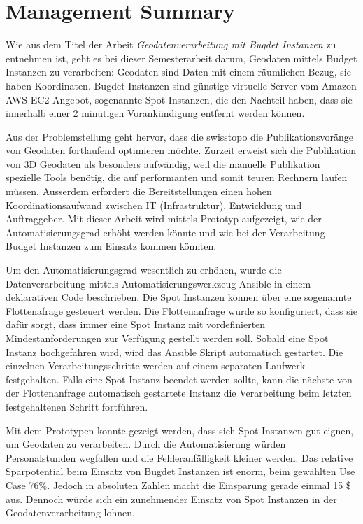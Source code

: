 \section{Management Summary}
Wie aus dem Titel der Arbeit \emph{Geodatenverarbeitung mit Bugdet Instanzen} zu entnehmen ist, geht es bei dieser Semesterarbeit darum, Geodaten mittels Budget Instanzen zu verarbeiten: Geodaten sind Daten mit einem räumlichen Bezug, sie haben Koordinaten. Bugdet Instanzen sind günstige virtuelle Server vom Amazon AWS EC2 Angebot, sogenannte Spot Instanzen, die den Nachteil haben, dass sie innerhalb einer 2 minütigen Vorankündigung entfernt werden können.

Aus der Problemstellung geht hervor, dass die swisstopo die Publikationsvoränge von Geodaten fortlaufend optimieren möchte. Zurzeit erweist sich die Publikation von 3D Geodaten als besonders aufwändig, weil die manuelle Publikation spezielle Tools benötig, die auf performanten und somit teuren Rechnern laufen müssen. Ausserdem erfordert die Bereitstellungen einen hohen Koordinationsaufwand zwischen IT (Infrastruktur), Entwicklung und Auftraggeber.
Mit dieser Arbeit wird mittels Prototyp aufgezeigt, wie der Automatisierungsgrad erhöht werden könnte und wie bei der Verarbeitung Budget Instanzen zum Einsatz kommen könnten.

Um den Automatisierungsgrad wesentlich zu erhöhen, wurde die Datenverarbeitung mittels Automatisierungswerkzeug Ansible in einem deklarativen Code beschrieben. Die Spot Instanzen können über eine sogenannte Flottenafrage gesteuert werden. Die Flottenanfrage wurde so konfiguriert, dass sie dafür sorgt, dass immer eine Spot Instanz mit vordefinierten Mindestanforderungen zur Verfügung gestellt werden soll. Sobald eine Spot Instanz hochgefahren wird, wird das Ansible Skript automatisch gestartet.
Die einzelnen Verarbeitungsschritte werden auf einem separaten Laufwerk festgehalten. Falls eine Spot Instanz beendet werden sollte, kann die nächste von der Flottenanfrage automatisch gestartete Instanz die Verarbeitung beim letzten festgehaltenen Schritt fortführen.

Mit dem Prototypen konnte gezeigt werden, dass sich Spot Instanzen gut eignen, um Geodaten zu verarbeiten. Durch die Automatisierung würden Personalstunden wegfallen und die Fehleranfälligkeit kleiner werden.
Das relative Sparpotential beim Einsatz von Bugdet Instanzen ist enorm, beim gewählten Use Case 76\%. Jedoch in absoluten Zahlen macht die Einsparung gerade einmal 15 \$ aus. Dennoch würde sich ein zunehmender Einsatz von Spot Instanzen in der Geodatenverarbeitung lohnen.


\pagebreak